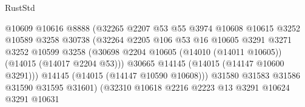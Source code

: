 \begin{lexlean}{RustStd}
\begin{coremodule}
                                          @10609
                                          @10616
                                          @8888
                                          (@32265
                                            @2207
                                            @53
                                            @55
                                            @3974
                                            @10608
                                            @10615
                                            @3252
                                            @10589
                                            @3258
                                            @30738
                                            (@32264
                                              @2205
                                              @106
                                              @53
                                              @16
                                              @10605
                                              @3291
                                              @3271
                                              @3252
                                              @10599
                                              @3258
                                              (@30698
                                                @2204
                                                @10605
                                                (@14010 (@14011 @10605))
                                                (@14015 (@14017 @2204 @53)))
                                              @30665
                                              @14145
                                              (@14015 (@14147 @10600 @3291)))
                                            @14145
                                            (@14015 (@14147 @10590 @10608)))
                                          @31580
                                          @31583
                                          @31586
                                          @31590
                                          @31595
                                          @31601)
                                        (@32310
                                          @10618
                                          @2216
                                          @2223
                                          @13
                                          @3291
                                          @10624
                                          @3291
                                          @10631

\end{coremodule}
\end{lexlean}
